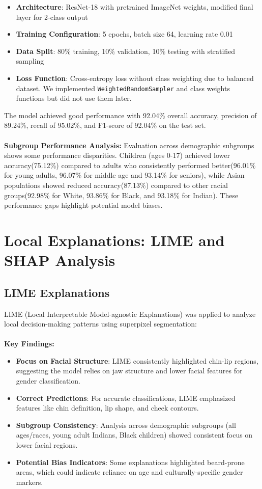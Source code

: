 \documentclass[11pt,letterpaper]{article}
\begin{document}
\begin{itemize}
\item \textbf{Architecture}: ResNet-18 with pretrained ImageNet weights, modified final layer for 2-class output
\item \textbf{Training Configuration}: 5 epochs, batch size 64, learning rate 0.01
\item \textbf{Data Split}: 80\% training, 10\% validation, 10\% testing with stratified sampling
\item \textbf{Loss Function}: Cross-entropy loss without class weighting due to balanced dataset. We implemented \texttt{WeightedRandomSampler} and class weights functions but did not use them later.
\end{itemize}

The model achieved good performance with 92.04\% overall accuracy, precision of 89.24\%, recall of 95.02\%, and F1-score of 92.04\% on the test set.
\\
\\
\textbf{Subgroup Performance Analysis:} Evaluation across demographic subgroups shows some performance disparities. Children (ages 0-17) achieved lower accuracy(75.12\%) compared to adults who consistently performed better(96.01\% for young adults, 96.07\% for middle age and 93.14\% for seniors), while Asian populations showed reduced accuracy(87.13\%) compared to other racial groups(92.98\% for White, 93.86\% for Black, and 93.18\% for Indian). These performance gaps highlight potential model biases.


\section{Local Explanations: LIME and SHAP Analysis}

\subsection{LIME Explanations}
LIME (Local Interpretable Model-agnostic Explanations) was applied to analyze local decision-making patterns using superpixel segmentation:
\\
\\
\textbf{Key Findings:}
\begin{itemize}
\item \textbf{Focus on Facial Structure}: LIME consistently highlighted chin-lip regions, suggesting the model relies on jaw structure and lower facial features for gender classification.
\item \textbf{Correct Predictions}: For accurate classifications, LIME emphasized features like chin definition, lip shape, and cheek contours.
\item \textbf{Subgroup Consistency}: Analysis across demographic subgroups (all ages/races, young adult Indians, Black children) showed consistent focus on lower facial regions.
\item \textbf{Potential Bias Indicators}: Some explanations highlighted beard-prone areas, which could indicate reliance on age and culturally-specific gender markers.
\end{itemize}
\end{document}
